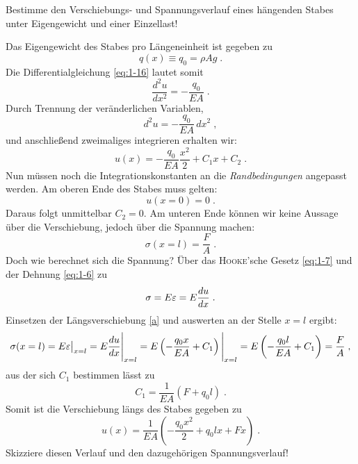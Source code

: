 \begin{example}
	Bestimme den Verschiebungs- und Spannungsverlauf eines hängenden Stabes unter Eigengewicht und einer Einzellast!
	\begin{center}
		
	\end{center}
	
	Das Eigengewicht des Stabes pro Längeneinheit ist gegeben zu
	\begin{equation}
		q(x)\equiv q_0 = \rho A g \; .
	\end{equation}
	Die Differentialgleichung \eqref{eq:1-16} lautet somit
	\begin{equation}
		\dfrac{d^2u}{dx^2}=-\dfrac{q_0}{EA} \; .
	\end{equation}
	Durch Trennung der veränderlichen Variablen,
	\begin{equation}
		d^2u = -\dfrac{q_0}{EA}\,dx^2 \; ,
	\end{equation}
	und anschließend zweimaliges integrieren erhalten wir:
	\begin{equation}
		u(x) = -\dfrac{q_0}{EA}\dfrac{x^2}{2} + C_1x + C_2 \; .
		\label{a}
	\end{equation}
	Nun müssen noch die Integrationskonstanten an die \emph{Randbedingungen} angepasst werden.
	Am oberen Ende des Stabes muss gelten:
	\begin{equation}
	u(x=0) = 0 \; .
	\end{equation}
	Daraus folgt unmittelbar $C_2=0$.
	Am unteren Ende können wir keine Aussage über die Verschiebung, jedoch über die Spannung machen:
	\begin{equation}
		\sigma(x=l) = \dfrac{F}{A} \; .
	\end{equation}
	Doch wie berechnet sich die Spannung?
	Über das \textsc{Hooke}'sche Gesetz \eqref{eq:1-7} und der Dehnung \eqref{eq:1-6} zu
	\begin{equation}
		\sigma = E\varepsilon = E\dfrac{du}{dx} \; .
	\end{equation}
	Einsetzen der Längsverschiebung \eqref{a} und auswerten an der Stelle $x=l$ ergibt:
	\begin{equation}
		\sigma(x=l)=E\varepsilon\big|_{x=l} = E\dfrac{du}{dx}\Bigg|_{x=l} = E\left(-\dfrac{q_0x}{EA}+C_1\right)\Bigg|_{x=l} = E\left(-\dfrac{q_0l}{EA}+C_1\right)=\dfrac{F}{A} \; ,
	\end{equation}
	aus der sich $C_1$ bestimmen lässt zu
	\begin{equation}
		C_1 = \dfrac{1}{EA}\left(F+q_0l\right) \; .
	\end{equation}
	Somit ist die Verschiebung längs des Stabes gegeben zu
	\begin{equation}
		u(x) = \dfrac{1}{EA}\left(-\dfrac{q_0x^2}{2}+q_0lx+Fx\right) \; .
	\end{equation}
	Skizziere diesen Verlauf und den dazugehörigen Spannungsverlauf!	
\end{example}

